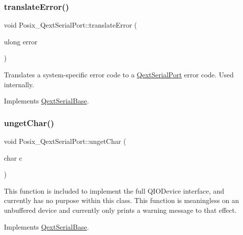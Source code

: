 \subsubsection{\texorpdfstring{translate\+Error()}{translateError()}}
{\footnotesize\ttfamily void Posix\+\_\+\+Qext\+Serial\+Port\+::translate\+Error (\begin{DoxyParamCaption}\item[{ulong}]{error }\end{DoxyParamCaption})\hspace{0.3cm}{\ttfamily [virtual]}}

Translates a system-\/specific error code to a \mbox{\hyperlink{class_qext_serial_port}{Qext\+Serial\+Port}} error code. Used internally. 

Implements \mbox{\hyperlink{class_qext_serial_base}{Qext\+Serial\+Base}}.

\mbox{\label{class_posix___qext_serial_port_a3a425e78db628945a666c52aa8638d0f}} 
\subsubsection{\texorpdfstring{unget\+Char()}{ungetChar()}}
{\footnotesize\ttfamily void Posix\+\_\+\+Qext\+Serial\+Port\+::unget\+Char (\begin{DoxyParamCaption}\item[{char}]{c }\end{DoxyParamCaption})\hspace{0.3cm}{\ttfamily [virtual]}}

This function is included to implement the full Q\+I\+O\+Device interface, and currently has no purpose within this class. This function is meaningless on an unbuffered device and currently only prints a warning message to that effect. 

Implements \mbox{\hyperlink{class_qext_serial_base}{Qext\+Serial\+Base}}.

\mbox{\label{class_posix___qext_serial_port_ae8aabe89e479259b0b991dbd6b424f78}} 

